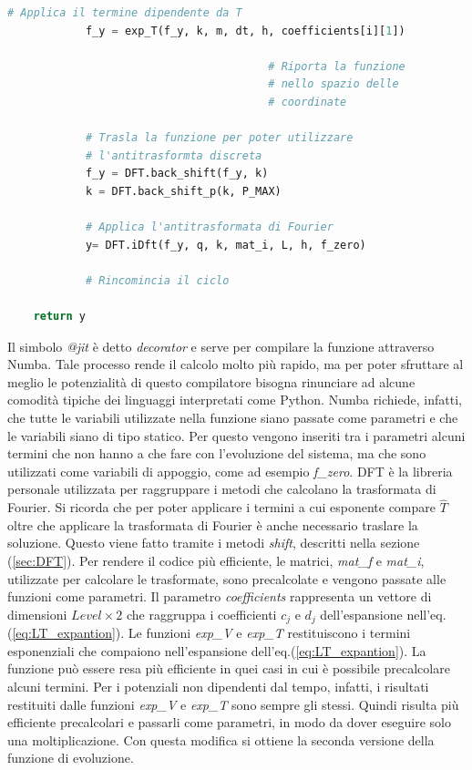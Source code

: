 \documentclass[12pt]{report}
\begin{document}
\begin{lstlisting}[language = Python]
            # Applica il termine dipendente da T
            f_y = exp_T(f_y, k, m, dt, h, coefficients[i][1])
            
                                        # Riporta la funzione 
                                        # nello spazio delle 
                                        # coordinate

            # Trasla la funzione per poter utilizzare 
            # l'antitrasformta discreta
            f_y = DFT.back_shift(f_y, k)
            k = DFT.back_shift_p(k, P_MAX)

            # Applica l'antitrasformata di Fourier
            y= DFT.iDft(f_y, q, k, mat_i, L, h, f_zero)
            
            # Rincomincia il ciclo 

    return y

\end{lstlisting}
Il simbolo \textsl{@jit} è detto \textsl{decorator} e serve per compilare la funzione attraverso Numba. Tale processo rende il calcolo molto più rapido, ma per poter sfruttare al meglio le potenzialità di questo compilatore bisogna rinunciare ad alcune comodità tipiche dei linguaggi interpretati come Python. Numba richiede, infatti, che tutte le variabili utilizzate nella funzione siano passate come parametri e che le variabili siano di tipo statico. Per questo vengono inseriti tra i parametri alcuni termini che non hanno a che fare con l'evoluzione del sistema, ma che sono utilizzati come variabili di appoggio, come ad esempio \textsl{f\_zero}.
DFT è la libreria personale utilizzata per raggruppare i metodi che calcolano la trasformata di Fourier. Si ricorda che per poter applicare i termini a cui esponente compare $\hat{T}$ oltre che applicare la trasformata di Fourier è anche necessario traslare la soluzione. Questo viene fatto tramite i metodi \textsl{shift}, descritti nella sezione (\ref{sec:DFT}). Per rendere il codice più efficiente, le matrici, \textsl{mat\_f} e \textsl{mat\_i}, utilizzate per calcolare le trasformate, sono precalcolate e vengono passate alle funzioni come parametri.
Il parametro \textsl{coefficients} rappresenta un vettore di dimensioni $Level \times 2$ che raggruppa i coefficienti $c_j$ e $d_j$ dell'espansione nell'eq.(\ref{eq:LT_expantion}). 
Le funzioni \textsl{exp\_V} e \textsl{exp\_T} restituiscono i termini esponenziali che compaiono nell'espansione dell'eq.(\ref{eq:LT_expantion}). La funzione può essere resa più efficiente in quei casi in cui è possibile precalcolare alcuni termini. Per i potenziali non dipendenti dal tempo, infatti, i risultati restituiti dalle funzioni \textsl{exp\_V} e \textsl{exp\_T} sono sempre gli stessi. Quindi risulta più efficiente precalcolari e passarli come parametri, in modo da dover eseguire solo una moltiplicazione. Con questa modifica si ottiene la seconda versione della funzione di evoluzione.
\end{document}
